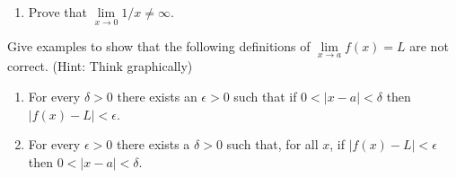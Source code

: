 \documentclass[9pt, a4paper, oneside]{amsart}
\begin{document}
\begin{questions}[resume]
\begin{enumerate}
		\item Prove that $ \lim \limits_{x \rightarrow 0} {1}/{x} \not = \infty$.
	\end{enumerate}



	\item Give examples to show that the following definitions of $\lim \limits _ {x \rightarrow a} f(x) = L$ are not correct. (Hint: Think graphically)
	\begin{enumerate}
		\item For every $ \delta > 0$ there exists an $ \epsilon > 0$ such that if $ 0<|x-a|< \delta$ then $ |f(x) - L|< \epsilon$.
		\item For every $\epsilon > 0$ there exists a $\delta > 0$ such that, for all $x$, if $|f(x) - L| < \epsilon$ then $0 < |x - a| < \delta$.
	\end{enumerate}





\end{questions}
\end{document}
